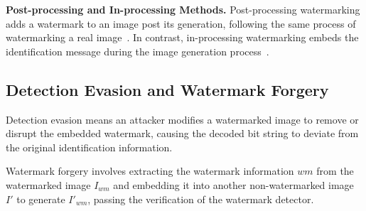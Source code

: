 \textbf{Post-processing and In-processing Methods.} Post-processing watermarking adds a watermark to an image post its generation, following the same process of watermarking a real image~\cite{chopra2012lsb, DWT-DCT, stegastamp}. In contrast, in-processing watermarking embeds the identification message during the image generation process~\cite{YU1, yu2021responsible}. 

\subsection{Detection Evasion and Watermark Forgery}
Detection evasion means an attacker modifies a watermarked image to remove or disrupt the embedded watermark, causing the decoded bit string to deviate from the original identification information.

Watermark forgery involves extracting the watermark information $wm$ from the watermarked image $I_{wm}$ and embedding it into another non-watermarked image $I'$ to generate $I'_{wm}$, passing the verification of the watermark detector.